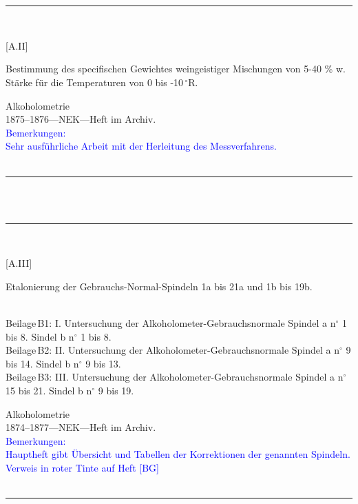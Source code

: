 \\
\vspace*{-2.5pt}\\
\parbox{\textwidth}{%
\rule{\textwidth}{1pt}\vspace*{-3mm}\\
\begin{minipage}[t]{0.22\textwidth}\vspace{0pt}
\Huge\rule[-4mm]{0cm}{1cm}[A.II]
\end{minipage}
\hfill
\begin{minipage}[t]{0.78\textwidth}\vspace{0pt}
\large Bestimmung des specifischen Gewichtes weingeistiger Mischungen von 5-40 \%{} w. Stärke für die Temperaturen von 0 bis -10\,{$^\circ$}R.\rule[-2mm]{0mm}{2mm}
\end{minipage}
{\footnotesize\flushright
Alkoholometrie\\
}
1875--1876\quad---\quad NEK\quad---\quad Heft im Archiv.\\
\textcolor{blue}{Bemerkungen:\\{}
Sehr ausführliche Arbeit mit der Herleitung des Messverfahrens.\\{}
}
\\[-15pt]
\rule{\textwidth}{1pt}
}
\\
\vspace*{-2.5pt}\\
\parbox{\textwidth}{%
\rule{\textwidth}{1pt}\vspace*{-3mm}\\
\begin{minipage}[t]{0.22\textwidth}\vspace{0pt}
\Huge\rule[-4mm]{0cm}{1cm}[A.III]
\end{minipage}
\hfill
\begin{minipage}[t]{0.78\textwidth}\vspace{0pt}
\large Etalonierung der Gebrauchs-Normal-Spindeln 1a bis 21a und 1b bis 19b.\rule[-2mm]{0mm}{2mm}
{\footnotesize \\{}
Beilage\,B1: I. Untersuchung der Alkoholometer-Gebrauchsnormale Spindel a n{$^\circ$} 1 bis 8. Sindel b n{$^\circ$} 1 bis 8.\\
Beilage\,B2: II. Untersuchung der Alkoholometer-Gebrauchsnormale Spindel a n{$^\circ$} 9 bis 14. Sindel b n{$^\circ$} 9 bis 13.\\
Beilage\,B3: III. Untersuchung der Alkoholometer-Gebrauchsnormale Spindel a n{$^\circ$} 15 bis 21. Sindel b n{$^\circ$} 9 bis 19.\\
}
\end{minipage}
{\footnotesize\flushright
Alkoholometrie\\
}
1874--1877\quad---\quad NEK\quad---\quad Heft im Archiv.\\
\textcolor{blue}{Bemerkungen:\\{}
Hauptheft gibt Übersicht und Tabellen der Korrektionen der genannten Spindeln. Verweis in roter Tinte auf Heft [BG]\\{}
}
\\[-15pt]
\rule{\textwidth}{1pt}
}
